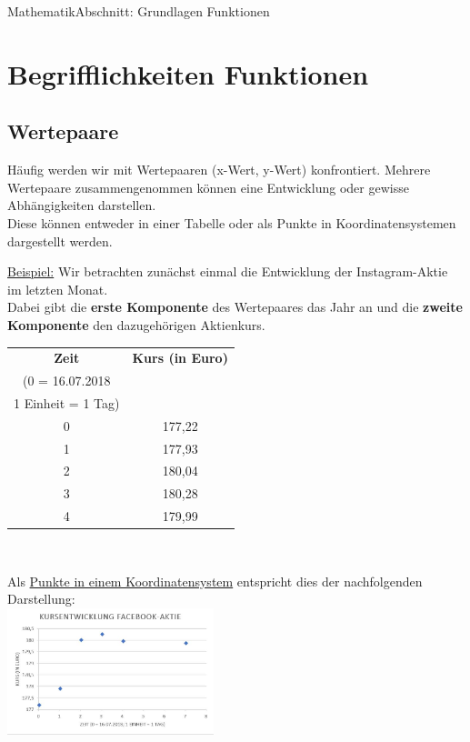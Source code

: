 \documentclass[11pt,twocolumn,oneside,openany,headings=optiontotoc,11pt,numbers=noenddot]{article}
\begin{document}
	\begin{worksheet}{}{Mathematik}{Abschnitt: Grundlagen Funktionen}
		\setcounter{section}{2}
		\setcounter{page}{10}
		\section{Begrifflichkeiten Funktionen}
		\subsection{Wertepaare} Häufig werden wir mit Wertepaaren (x-Wert, y-Wert) konfrontiert. Mehrere Wertepaare zusammengenommen können eine Entwicklung oder gewisse Abhängigkeiten darstellen.\\
		Diese können entweder in einer Tabelle oder als Punkte in Koordinatensystemen dargestellt werden.\\
		\par\bigskip\noindent
		\underline{Beispiel:} Wir betrachten zunächst einmal die Entwicklung der Instagram-Aktie im letzten Monat.\\
		Dabei gibt die \textbf{erste Komponente} des Wertepaares das Jahr an und die \textbf{zweite Komponente} den dazugehörigen Aktienkurs.\\
		\par\bigskip\noindent
		\begin{tabularx}{0.45\textwidth}{c|c}
			\textbf{Zeit} & \textbf{Kurs (in Euro)}\\
			(0 = 16.07.2018 & \\
			1 Einheit = 1 Tag) & \\
			\hline
			0 & 177,22\\
			\hline
			1 & 177,93\\
			\hline
			2 & 180,04\\
			\hline
			3 & 180,28\\
			\hline
			4 & 179,99\\
			\hline
		\end{tabularx}\\
		\par\noindent
		Als \underline{Punkte in einem Koordinatensystem} entspricht dies der nachfolgenden Darstellung:\\
		\includegraphics[width=0.45\textwidth]{../99_Bilder/fb.jpg}\\

\end{worksheet}
\end{document}

